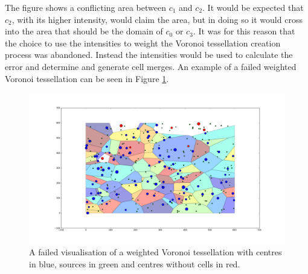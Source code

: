 The figure shows a conflicting area between $c_1$ and $c_2$. It would be expected that $c_2$, with its higher intensity, would claim the area, but in doing so it would cross into the area that should be the domain of $c_0$ or $c_3$. It was for this reason that the choice to use the intensities to weight the Voronoi tessellation creation process was abandoned. Instead the intensities would be used to calculate the error and determine and generate cell merges. An example of a failed weighted Voronoi tessellation can be seen in Figure \ref{fig:w_voronoi}.
\begin{figure}[H]
\includegraphics[width=\textwidth]{Images/weighted_voronoi.png}
\centering
\caption{A failed visualisation of a weighted Voronoi tessellation with centres in blue, sources in green and centres without cells in red.}
\label{fig:w_voronoi}
\end{figure}
